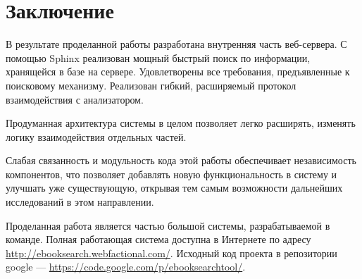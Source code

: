 \section{Заключение}
В результате проделанной работы разработана внутренняя часть веб-сервера.
С помощью Sphinx реализован мощный быстрый поиск по информации, хранящейся в базе на сервере.
Удовлетворены все требования, предъявленные к поисковому механизму.
Реализован гибкий, расширяемый протокол взаимодействия с анализатором.

Продуманная архитектура системы в целом позволяет легко расширять, изменять логику взаимодействия отдельных частей.

Слабая связанность и модульность кода этой работы обеспечивает независимость компонентов, что позволяет добавлять новую функциональность в систему и улучшать уже существующую,
открывая тем самым возможности дальнейших исследований в этом направлении.

Проделанная работа является частью большой системы, разрабатываемой в команде. Полная работающая система доступна в Интернете по адресу\\ \url{http://ebooksearch.webfactional.com/}. Исходный код проекта в репозитории google --- \url{https://code.google.com/p/ebooksearchtool/}.

